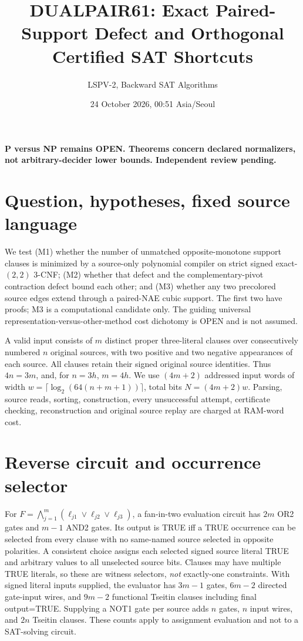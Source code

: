 \documentclass[11pt]{article}
\title{DUALPAIR61: Exact Paired-Support Defect and Orthogonal Certified SAT Shortcuts}
\author{LSPV-2, Backward SAT Algorithms}
\date{24 October 2026, 00:51 Asia/Seoul}
\begin{document}
\maketitle
\begin{center}\textbf{P versus NP remains OPEN. Theorems concern declared normalizers, not arbitrary-decider lower bounds. Independent review pending.}\end{center}

\section{Question, hypotheses, fixed source language}
We test (M1) whether the number of unmatched opposite-monotone support clauses is minimized by a source-only polynomial compiler on strict signed exact-$(2,2)$ 3-CNF; (M2) whether that defect and the complementary-pivot contraction defect bound each other; and (M3) whether any two precolored source edges extend through a paired-NAE cubic support. The first two have proofs; M3 is a computational candidate only. The guiding universal representation-versus-other-method cost dichotomy is OPEN and is not assumed.

A valid input consists of $m$ distinct proper three-literal clauses over consecutively numbered $n$ original sources, with two positive and two negative appearances of each source. All clauses retain their signed original source identities. Thus $4n=3m$, and, for $n=3h$, $m=4h$. We use $(4m+2)$ addressed input words of width $w=\lceil\log_2(64(n+m+1))\rceil$, total bits $N=(4m+2)w$. Parsing, source reads, sorting, construction, every unsuccessful attempt, certificate checking, reconstruction and original source replay are charged at RAM-word cost.

\section{Reverse circuit and occurrence selector}
For $F=\bigwedge_{j=1}^m(\ell_{j1}\vee\ell_{j2}\vee\ell_{j3})$, a fan-in-two evaluation circuit has $2m$ OR2 gates and $m-1$ AND2 gates. Its output is TRUE iff a TRUE occurrence can be selected from every clause with no same-named source selected in opposite polarities. A consistent choice assigns each selected signed source literal TRUE and arbitrary values to all unselected source bits. Clauses may have multiple TRUE literals, so these are witness selectors, \emph{not} exactly-one constraints. With signed literal inputs supplied, the evaluator has $3m-1$ gates, $6m-2$ directed gate-input wires, and $9m-2$ functional Tseitin clauses including final output=TRUE. Supplying a NOT1 gate per source adds $n$ gates, $n$ input wires, and $2n$ Tseitin clauses. These counts apply to assignment evaluation and not to a SAT-solving circuit.
\end{document}
